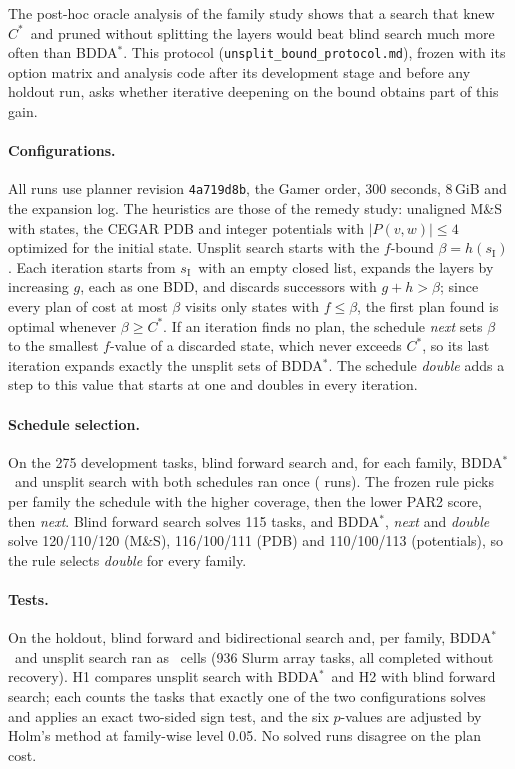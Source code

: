 \documentclass[letterpaper]{article}
\newcommand{\num}[1]{\numprint{#1}}
\newcommand{\sinit}{\ensuremath{s_{\mathrm{I}}}}
\newcommand{\copt}{\ensuremath{C^{*}}}
\newcommand{\bddastar}{BDDA\ensuremath{^{*}}}
\theoremstyle{plain}
\theoremstyle{definition}
\theoremstyle{remark}
\begin{document}
The post-hoc oracle analysis of the family study shows that a search that
knew \copt\ and pruned without splitting the layers would beat blind search
much more often than \bddastar.  This protocol
(\texttt{unsplit\_\allowbreak bound\_\allowbreak protocol.md}), frozen with its option matrix and
analysis code after its development stage and before any holdout run, asks
whether iterative deepening on the bound obtains part of this gain.

\paragraph{Configurations.}
All runs use planner revision \texttt{4a719d8b}, the Gamer order, 300
seconds, 8\,GiB and the expansion log.  The heuristics are those of the
remedy study: unaligned M\&S with \num{10000} states, the CEGAR PDB and
integer potentials with $|P(v,w)|\leq4$ optimized for the initial state.
Unsplit search starts with the $f$-bound $\beta=h(\sinit)$.  Each iteration
starts from \sinit\ with an empty closed list, expands the layers by
increasing $g$, each as one BDD, and discards successors with $g+h>\beta$;
since every plan of cost at most $\beta$ visits only states with
$f\leq\beta$, the first plan found is optimal whenever $\beta\geq\copt$.  If
an iteration finds no plan, the schedule \emph{next} sets $\beta$ to the
smallest $f$-value of a discarded state, which never exceeds \copt, so its
last iteration expands exactly the unsplit sets of \bddastar.  The schedule
\emph{double} adds a step to this value that starts at one and doubles in
every iteration.

\paragraph{Schedule selection.}
On the 275 development tasks, blind forward search and, for each family,
\bddastar\ and unsplit search with both schedules ran once (\num{2750}
runs).  The frozen rule picks per family the schedule with the higher
coverage, then the lower PAR2 score, then \emph{next}.  Blind forward search
solves 115 tasks, and \bddastar, \emph{next} and \emph{double} solve
120/110/120 (M\&S), 116/100/111 (PDB) and 110/100/113 (potentials), so the
rule selects \emph{double} for every family.

\paragraph{Tests.}
On the holdout, blind forward and bidirectional search and, per family,
\bddastar\ and unsplit search ran as \UbCells\ cells (936 Slurm array tasks,
all completed without recovery).  H1 compares unsplit search with \bddastar\
and H2 with blind forward search; each counts the tasks that exactly one of
the two configurations solves and applies an exact two-sided sign test, and
the six $p$-values are adjusted by Holm's method at family-wise level 0.05.
No solved runs disagree on the plan cost.
\end{document}
